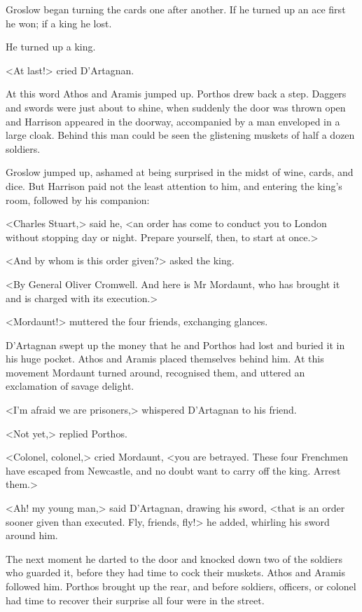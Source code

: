 Groslow began turning the cards one after another. If he turned up an ace first he won; if a king he lost.

He turned up a king.

<At last!> cried D'Artagnan.

At this word Athos and Aramis jumped up. Porthos drew back a step. Daggers and swords were just about to shine, when suddenly the door was thrown open and Harrison appeared in the doorway, accompanied by a man enveloped in a large cloak. Behind this man could be seen the glistening muskets of half a dozen soldiers.

Groslow jumped up, ashamed at being surprised in the midst of wine, cards, and dice. But Harrison paid not the least attention to him, and entering the king's room, followed by his companion:

<Charles Stuart,> said he, <an order has come to conduct you to London without stopping day or night. Prepare yourself, then, to start at once.>

<And by whom is this order given?> asked the king.

<By General Oliver Cromwell. And here is Mr Mordaunt, who has brought it and is charged with its execution.>

<Mordaunt!> muttered the four friends, exchanging glances.

D'Artagnan swept up the money that he and Porthos had lost and buried it in his huge pocket. Athos and Aramis placed themselves behind him. At this movement Mordaunt turned around, recognised them, and uttered an exclamation of savage delight.

<I'm afraid we are prisoners,> whispered D'Artagnan to his friend.

<Not yet,> replied Porthos.

<Colonel, colonel,> cried Mordaunt, <you are betrayed. These four Frenchmen have escaped from Newcastle, and no doubt want to carry off the king. Arrest them.>

<Ah! my young man,> said D'Artagnan, drawing his sword, <that is an order sooner given than executed. Fly, friends, fly!> he added, whirling his sword around him.

The next moment he darted to the door and knocked down two of the soldiers who guarded it, before they had time to cock their muskets. Athos and Aramis followed him. Porthos brought up the rear, and before soldiers, officers, or colonel had time to recover their surprise all four were in the street.

